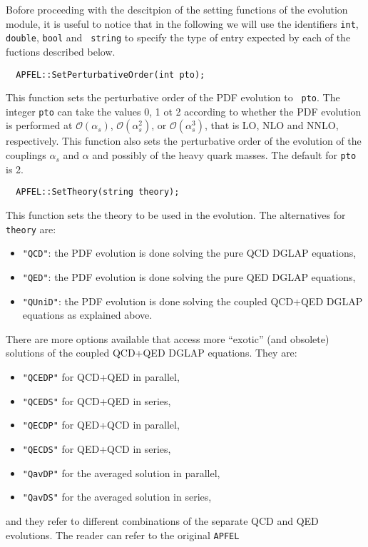 \documentclass[11pt,a4paper]{article}
\begin{document}
Bofore proceeding with the descitpion of the setting functions of the
evolution module, it is useful to notice that in the following we will
use the identifiers {\tt int}, {\tt double}, {\tt bool} and {\tt
  string} to specify the type of entry expected by each of the
fuctions described below.

\begin{lstlisting}
  APFEL::SetPerturbativeOrder(int pto);
\end{lstlisting}
This function sets the perturbative order of the PDF evolution to {\tt
  pto}. The integer {\tt pto} can take the values 0, 1 ot 2
according to whether the PDF evolution is performed at
$\mathcal{O}(\alpha_s)$, $\mathcal{O}(\alpha_s^2)$, or
$\mathcal{O}(\alpha_s^3)$, that is LO, NLO and NNLO,
respectively. This function also sets the perturbative order of the
evolution of the couplings $\alpha_s$ and $\alpha$ and possibly of the
heavy quark masses. The default for {\tt pto} is 2.
\begin{lstlisting}
  APFEL::SetTheory(string theory);
\end{lstlisting}
This function sets the theory to be used in the evolution. The
alternatives for {\tt theory} are:
\begin{itemize}
\item {\tt "QCD"}: the PDF evolution is done solving the pure QCD
  DGLAP equations,
\item {\tt "QED"}: the PDF evolution is done solving the pure QED
  DGLAP equations,
\item {\tt "QUniD"}: the PDF evolution is done solving the coupled
  QCD+QED DGLAP equations as explained above.
\end{itemize}
There are more options available that access more ``exotic'' (and
obsolete) solutions of the coupled QCD+QED DGLAP equations. They are:
\begin{itemize}
\item {\tt "QCEDP"} for QCD+QED in parallel,
\item {\tt "QCEDS"} for QCD+QED in series,
\item {\tt "QECDP"} for QED+QCD in parallel,
\item {\tt "QECDS"} for QED+QCD in series,
\item {\tt "QavDP"} for the averaged solution in parallel,
\item {\tt "QavDS"} for the averaged solution in series,
\end{itemize}
and they refer to different combinations of the separate QCD and QED
evolutions. The reader can refer to the original {\tt APFEL}
\end{document}
